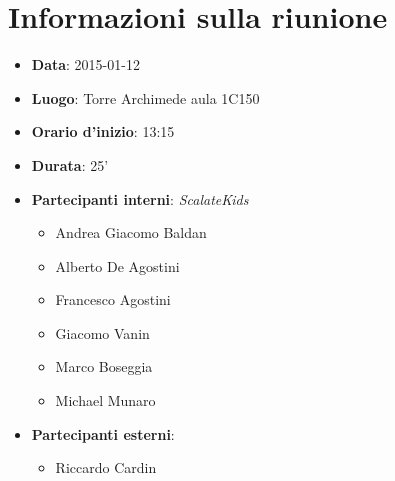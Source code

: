 \documentclass{scalatekids-article}
\begin{document}
\section{Informazioni sulla riunione}
\begin{itemize}
\item \textbf{Data}: 2015-01-12
\item \textbf{Luogo}: Torre Archimede aula 1C150
\item \textbf{Orario d'inizio}: 13:15
\item \textbf{Durata}: 25'
\item \textbf{Partecipanti interni}: \textit{ScalateKids}
  \begin{itemize}
  \item Andrea Giacomo Baldan
  \item Alberto De Agostini
  \item Francesco Agostini
  \item Giacomo Vanin
  \item Marco Boseggia
  \item Michael Munaro
  \end{itemize}
\item \textbf{Partecipanti esterni}:
  \begin{itemize}
  \item Riccardo Cardin
  \end{itemize}
\end{itemize}
\end{document}
